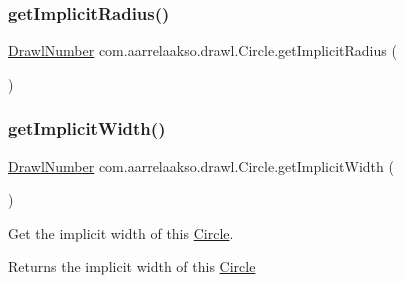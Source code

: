 \subsubsection{\texorpdfstring{get\+Implicit\+Radius()}{getImplicitRadius()}}
{\footnotesize\ttfamily \hyperlink{classcom_1_1aarrelaakso_1_1drawl_1_1_drawl_number}{Drawl\+Number} com.\+aarrelaakso.\+drawl.\+Circle.\+get\+Implicit\+Radius (\begin{DoxyParamCaption}{ }\end{DoxyParamCaption})\hspace{0.3cm}{\ttfamily [protected]}}

\mbox{\label{classcom_1_1aarrelaakso_1_1drawl_1_1_circle_a63c0bcbf1138de1f85041213116c1d3a}} 
\subsubsection{\texorpdfstring{get\+Implicit\+Width()}{getImplicitWidth()}}
{\footnotesize\ttfamily \hyperlink{classcom_1_1aarrelaakso_1_1drawl_1_1_drawl_number}{Drawl\+Number} com.\+aarrelaakso.\+drawl.\+Circle.\+get\+Implicit\+Width (\begin{DoxyParamCaption}{ }\end{DoxyParamCaption})\hspace{0.3cm}{\ttfamily [protected]}}



Get the implicit width of this \hyperlink{classcom_1_1aarrelaakso_1_1drawl_1_1_circle}{Circle}. 

\begin{DoxyReturn}{Returns}
the implicit width of this \hyperlink{classcom_1_1aarrelaakso_1_1drawl_1_1_circle}{Circle} 
\end{DoxyReturn}
\mbox{\label{classcom_1_1aarrelaakso_1_1drawl_1_1_circle_a9f611727bb4828ab95c9c1c7059f5c6d}} 
